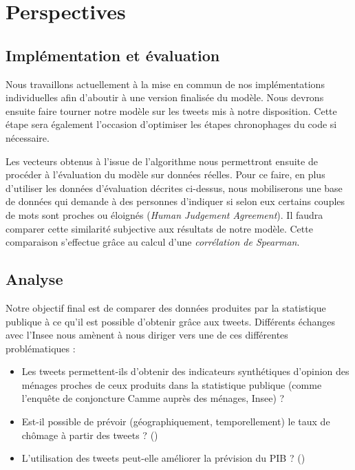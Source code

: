 \documentclass[11pt,french,french]{article}
\begin{document}
\normalsize

\hypertarget{perspectives}{%
\section{Perspectives}\label{perspectives}}

\hypertarget{impluxe9mentation-et-uxe9valuation}{%
\subsection{Implémentation et
évaluation}\label{impluxe9mentation-et-uxe9valuation}}

Nous travaillons actuellement à la mise en commun de nos implémentations
individuelles afin d'aboutir à une version finalisée du modèle. Nous
devrons ensuite faire tourner notre modèle sur les tweets mis à notre
disposition. Cette étape sera également l'occasion d'optimiser les
étapes chronophages du code si nécessaire.

Les vecteurs obtenus à l'issue de l'algorithme nous permettront ensuite
de procéder à l'évaluation du modèle sur données réelles. Pour ce faire,
en plus d'utiliser les données d'évaluation décrites ci-dessus, nous
mobiliserons une base de données qui demande à des personnes d'indiquer
si selon eux certains couples de mots sont proches ou éloignés
(\emph{Human Judgement Agreement}). Il faudra comparer cette similarité
subjective aux résultats de notre modèle. Cette comparaison s'effectue
grâce au calcul d'une \emph{corrélation de Spearman}.

\hypertarget{analyse}{%
\subsection{Analyse}\label{analyse}}

Notre objectif final est de comparer des données produites par la
statistique publique à ce qu'il est possible d'obtenir grâce aux tweets.
Différents échanges avec l'Insee nous amènent à nous diriger vers une de
ces différentes problématiques :

\begin{itemize}
\item
  Les tweets permettent-ils d'obtenir des indicateurs synthétiques
  d'opinion des ménages proches de ceux produits dans la statistique
  publique (comme l'enquête de conjoncture Camme auprès des ménages,
  Insee) ?
\item
  Est-il possible de prévoir (géographiquement, temporellement) le taux
  de chômage à partir des tweets ? (\cite{Chomage})
\item
  L'utilisation des tweets peut-elle améliorer la prévision du PIB ?
  (\cite{Monde})
\end{itemize}
\end{document}
